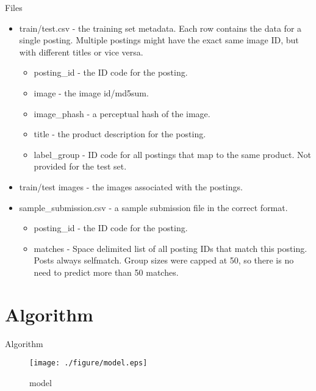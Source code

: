 \documentclass[
 size=14pt,
 paper=smartboard,  %
 mode=present, 		%
 display=slides, 	%
 style=tuliplab,  	%
 pauseslide,
 fleqn,leqno]{powerdot}
\begin{document}
\begin{slide}{Files}

\begin{itemize}
\item train/test.csv - the training set metadata. Each row contains the data for a single posting. Multiple postings might have the exact same image ID, but with different titles or vice versa.
\begin{itemize}
\item posting\_id - the ID code for the posting.
\item image - the image id/md5sum.
\item image\_phash - a perceptual hash of the image.
\item title - the product description for the posting.
\item label\_group - ID code for all postings that map to the same product. Not provided for the test set.
\end{itemize}
\item train/test images - the images associated with the postings.
\item sample\_submission.csv - a sample submission file in the correct format.
\begin{itemize}
\item posting\_id - the ID code for the posting.
\item matches - Space delimited list of all posting IDs that match this posting. Posts always selfmatch. Group sizes were capped at 50, so there is no need to predict more than 50 matches.
\end{itemize}
\end{itemize}
\end{slide}

\section{Algorithm}
\begin{slide}[toc=,bm=]{Algorithm}
	\begin{center}
		\begin{figure}[htbp]
			\texttt{[image: ./figure/model.eps]}
			\caption{model}
		\end{figure}
	\end{center}
\end{slide}
\end{document}
